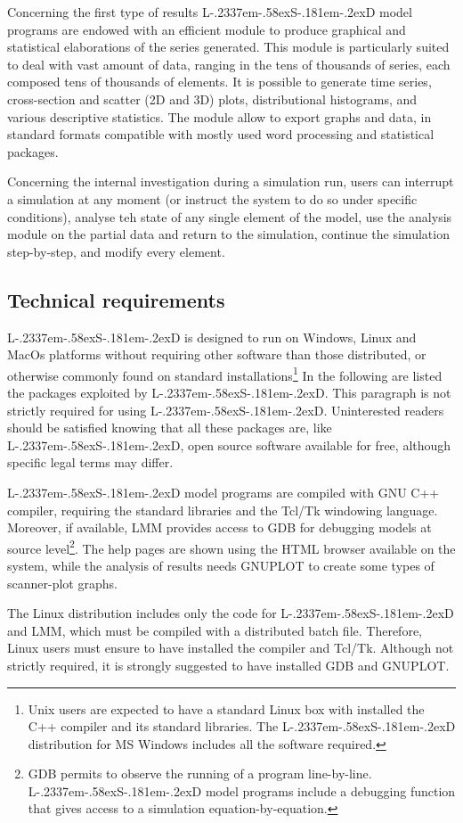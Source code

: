 \documentclass [11pt,a4paper] {book}
\def\LsD{{L\kern-.2337em\lower-.58ex\hbox{S}\kern-.181em\lower-.2ex\hbox{D}}\xspace}
\begin{document}
Concerning the first type of results \LsD model programs are endowed with an efficient module to produce graphical and statistical elaborations of the series generated. This module is particularly suited to deal with vast amount of data, ranging in the tens of thousands of series, each composed tens of thousands of elements. It is possible to generate time series, cross-section and scatter (2D and 3D) plots, distributional histograms, and various descriptive statistics. The module allow to export graphs and data, in standard formats  compatible with mostly used word processing and statistical packages.

Concerning the internal investigation during a simulation run, users can interrupt a simulation at any moment (or instruct the system to do so under specific conditions), analyse teh state of any single element of the model, use the analysis module on the partial data and return to the simulation, continue the simulation step-by-step, and modify every element.


\subsection{Technical requirements}

\LsD is designed to run on Windows, Linux and MacOs platforms without requiring
other software than those distributed, or otherwise commonly found on standard installations\footnote{Unix users are expected to have a standard Linux box with installed the
C++ compiler and its standard libraries. The \LsD distribution for MS Windows includes all
the software required.} In the following are listed the packages exploited by \LsD. This
paragraph is not strictly required for using \LsD. Uninterested readers should be
satisfied knowing that all these packages are, like \LsD, open source software available
for free, although specific legal terms may differ.

 \LsD model programs are compiled with GNU C++ compiler, requiring the standard
libraries and the Tcl/Tk windowing language. Moreover, if available, LMM provides access
to GDB for debugging models at source level\footnote{GDB permits to observe the running
of a program line-by-line. \LsD model programs include a debugging function that gives
access to a simulation equation-by-equation.}. The help pages are shown using the HTML
browser available on the system, while the analysis of results needs GNUPLOT to create
some types of scanner-plot graphs.

The Linux distribution includes only the code for \LsD and LMM, which must be compiled
with a distributed batch file. Therefore, Linux users must ensure to have installed the
compiler and Tcl/Tk. Although not strictly required, it is strongly suggested to have
installed GDB and GNUPLOT.
\end{document}
